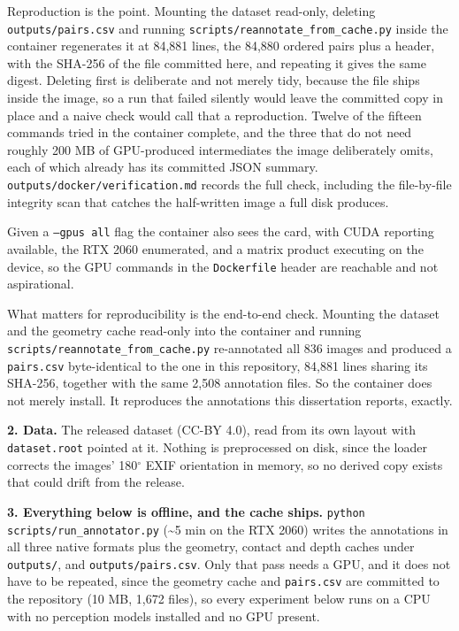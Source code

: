 Reproduction is the point. Mounting the dataset read-only, deleting \texttt{outputs/pairs.csv} and running \texttt{scripts/reannotate\_\allowbreak{}from\_\allowbreak{}cache.py} inside the container regenerates it at 84,881 lines, the 84,880 ordered pairs plus a header, with the SHA-256 of the file committed here, and repeating it gives the same digest. Deleting first is deliberate and not merely tidy, because the file ships inside the image, so a run that failed silently would leave the committed copy in place and a naive check would call that a reproduction. Twelve of the fifteen commands tried in the container complete, and the three that do not need roughly 200 MB of GPU-produced intermediates the image deliberately omits, each of which already has its committed JSON summary. \texttt{outputs/docker/verification.md} records the full check, including the file-by-file integrity scan that catches the half-written image a full disk produces.

Given a \texttt{--gpus all} flag the container also sees the card, with CUDA reporting available, the RTX 2060 enumerated, and a matrix product executing on the device, so the GPU commands in the \texttt{Dockerfile} header are reachable and not aspirational.

What matters for reproducibility is the end-to-end check. Mounting the dataset and the geometry cache read-only into the container and running \texttt{scripts/reannotate\_\allowbreak{}from\_\allowbreak{}cache.py} re-annotated all 836 images and produced a \texttt{pairs.csv} byte-identical to the one in this repository, 84,881 lines sharing its SHA-256, together with the same 2,508 annotation files. So the container does not merely install. It reproduces the annotations this dissertation reports, exactly.

\textbf{2. Data.} The released dataset (CC-BY 4.0), read from its own layout with \texttt{dataset.root} pointed at it. Nothing is preprocessed on disk, since the loader corrects the images' 180$^{\circ}$ EXIF orientation in memory, so no derived copy exists that could drift from the release.

\textbf{3. Everything below is offline, and the cache ships.} \texttt{python scripts/run\_\allowbreak{}annotator.py} (\textasciitilde{}5 min on the RTX 2060) writes the annotations in all three native formats plus the geometry, contact and depth caches under \texttt{outputs/}, and \texttt{outputs/pairs.csv}. Only that pass needs a GPU, and it does not have to be repeated, since the geometry cache and \texttt{pairs.csv} are committed to the repository (10 MB, 1,672 files), so every experiment below runs on a CPU with no perception models installed and no GPU present.

